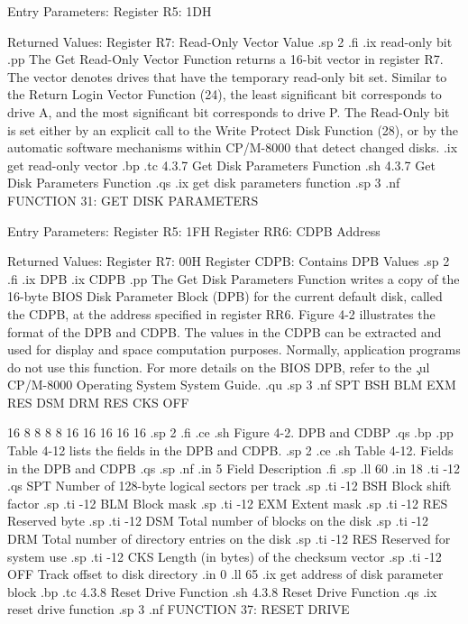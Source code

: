                  Entry Parameters:
                    Register   R5:  1DH

                 Returned  Values:
                    Register   R7:  Read-Only
                                    Vector Value
.sp 2
.fi
.ix read-only bit
.pp
The Get Read-Only Vector Function returns a 16-bit vector in register   R7.
The vector denotes drives that have the temporary read-only bit set. Similar
to the Return Login Vector Function (24), the least significant bit
corresponds to drive A, and the most significant bit corresponds to drive
P. The Read-Only bit is set either by an explicit call to the Write Protect
Disk Function (28), or by the automatic software mechanisms within CP/M-8000
that detect changed disks. 
.ix get read-only vector
.bp
.tc         4.3.7 Get Disk Parameters Function
.sh
4.3.7  Get Disk Parameters Function
.qs
.ix get disk parameters function
.sp 3
.nf
                FUNCTION 31:  GET DISK PARAMETERS

                 Entry Parameters:
                    Register   R5:  1FH
                    Register  RR6:  CDPB Address

                 Returned  Values:
                    Register   R7:  00H
                    Register CDPB:  Contains DPB
                                    Values
.sp 2
.fi
.ix DPB
.ix CDPB
.pp
The Get Disk Parameters Function writes a copy of the 16-byte
BIOS Disk Parameter Block (DPB) for the current default disk,
called the CDPB, at the address specified in register  RR6. 
Figure 4-2 illustrates the format of the DPB and CDPB. The
values in the CDPB can be extracted and used for display and
space computation purposes.  Normally, application programs do
not use this function. For more details on the BIOS DPB, refer to
the \c
.ul
CP/M-8000 Operating System System Guide. 
.qu
.sp 3
.nf
       SPT   BSH  BLM  EXM  RES   DSM   DRM  RES   CKS  OFF

       16     8    8    8    8     16    16   16    16   16
.sp 2
.fi
.ce
.sh
Figure 4-2. DPB and CDBP
.qs
.bp
.pp
Table 4-12 lists the fields in the DPB and CDPB.
.sp 2
.ce
.sh
Table 4-12.  Fields in the DPB and CDPB
.qs
.sp
.nf
.in 5
Field                       Description
.fi
.sp
.ll 60
.in 18
.ti -12
.qs
SPT         Number of 128-byte logical sectors per track
.sp
.ti -12
BSH         Block shift factor
.sp
.ti -12
BLM         Block mask
.sp
.ti -12
EXM         Extent mask
.sp
.ti -12
RES         Reserved byte
.sp
.ti -12
DSM         Total number of blocks on the disk
.sp
.ti -12
DRM         Total number of directory entries on the disk
.sp
.ti -12
RES         Reserved for system use 
.sp
.ti -12
CKS         Length (in bytes) of the checksum vector
.sp
.ti -12
OFF         Track offset to disk directory
.in 0
.ll 65
.ix get address of disk parameter block
.bp
.tc         4.3.8  Reset Drive Function
.sh  
4.3.8  Reset Drive Function
.qs
.ix reset drive function
.sp 3
.nf
                    FUNCTION 37:  RESET DRIVE

